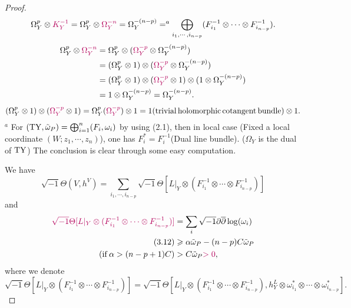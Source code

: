 \documentclass[lang=en,12pt]{beautybook}
\begin{document}
\begin{proof}
    \[ \Omega^p_Y \otimes {\color[HTML]{B4005A}K_Y^{- 1}} = \Omega^p_Y \otimes
        {\color[HTML]{B4005A}\Omega^{- n}_Y} = \Omega_Y^{- (n - p)} =^a
        \bigoplus_{i_1, \cdots, i_{n - p}} (F_{i_1}^{- 1} \otimes \cdots \otimes
        F_{i_{n - p}}^{- 1}) . \]
    \begin{align*}
        \Omega^p_Y \otimes {\color[HTML]{B4005A}\Omega^{- n}_Y} & =  \Omega^p_Y
        \otimes ({\color[HTML]{B4005A}\Omega^{- p}_Y} \otimes \Omega_Y^{- (n -
        p)})\\
        & =  (\Omega_Y^p \otimes 1) \otimes ({\color[HTML]{B4005A}\Omega^{-
        p}_Y} \otimes \Omega_Y^{- (n - p)})\\
        & =  (\Omega_Y^p \otimes 1) \otimes ({\color[HTML]{B4005A}\Omega^{-
        p}_Y} \otimes 1) \otimes (1 \otimes \Omega_Y^{- (n - p)})\\
        & =  1 \otimes \Omega_Y^{- (n - p)} = \Omega_Y^{- (n - p)} .
    \end{align*}
    \[ (\Omega_Y^p \otimes 1) \otimes ({\color[HTML]{B4005A}\Omega^{- p}_Y}
    \otimes 1) = \Omega_Y^p ({\color[HTML]{B4005A}\Omega_Y^{- p}}) \otimes 1
    = 1 (\tmop{trivial} \tmop{holomorphic} \tmop{cotangent} \tmop{bundle})
    \otimes 1. \]
    $^a$ For $(\operatorname{TY}, \tilde{\omega}_P) = \bigoplus_{i = 1}^n (F_i,
    \omega_i)$ by using (2.1), then in local case (Fixed a local coordinate $(W
    ; z_1, \cdots, z_n)$), one has $F_i^{\ast} = F_i^{- 1}$(Dual line
    bundle)\cite[\S 2.2,p71]{Huybrechts2010Complex}. ($\Omega_Y$ is the dual
    of $\operatorname{TY}$) The conclusion is clear through some easy computation.
    
    We have
    \[ 
        \sqrt{- 1} \Theta (V, h^V)  =  \sum_{i_1, \cdots, i_{n - p}} \sqrt{-
        1} \Theta [L |_Y \otimes  (F_{i_1}^{- 1} \otimes \cdots
        \otimes F_{i_{n - p}}^{- 1})]
    \]
    and
    \begin{align*}
    {\color[HTML]{B4005A}\sqrt{- 1} \Theta [L |_Y \otimes 
    (F_{i_1}^{- 1} \otimes \cdots \otimes F_{i_{n - p}}^{- 1})]} & =  \sum_i
    \sqrt{- 1} \partial \overline{\partial} \log (\omega_i)\\
    (3.12) & \geqslant  \alpha \tilde{\omega}_P - (n - p) C
    \tilde{\omega}_P\\
    (\tmop{if} \alpha > (n - p + 1) C) & >  C\tilde{\omega}_P
    {\color[HTML]{B4005A}> 0} ,
    \end{align*}
where we denote 
    \[\sqrt{- 1} \Theta [L |_Y \otimes 
(F_{i_1}^{- 1} \otimes \cdots \otimes F_{i_{n - p}}^{- 1})]=\sqrt{- 1} \Theta [L |_Y \otimes 
(F_{i_1}^{- 1} \otimes \cdots \otimes F_{i_{n - p}}^{- 1}), h_Y^L\otimes \omega_{i_1}^* \otimes\cdots\otimes\omega_{i_{n-p}}^*].\]


\end{proof}
\end{document}
